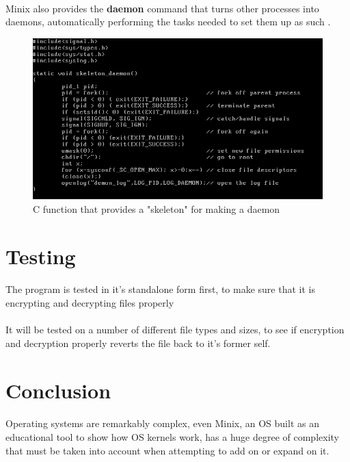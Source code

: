 \documentclass{article}
\begin{document}
        \paragraph{}Minix also provides the \textbf{daemon} command that turns other processes into daemons, automatically performing the tasks needed to set them up as such \parencite{daemon_command_minix}.

        \begin{figure}[htbp]
            \centering
            \includegraphics[width=\textwidth]{daemon_code_screenshot_1.png}
            \caption{C function that provides a "skeleton" for making a daemon}
            \label{fig:my_label}
        \end{figure}
    

\section{Testing}
    \paragraph{}The program is tested in it's standalone form first, to make sure that it is encrypting and decrypting files properly
    \paragraph{}It will be tested on a number of different file types and sizes, to see if encryption and decryption properly reverts the file back to it's former self.

\section{Conclusion}
    \paragraph{}Operating systems are remarkably complex, even Minix, an OS built as an educational tool to show how OS kernels work, has a huge degree of complexity that must be taken into account when attempting to add on or expand on it.

\printbibliography
\end{document}
